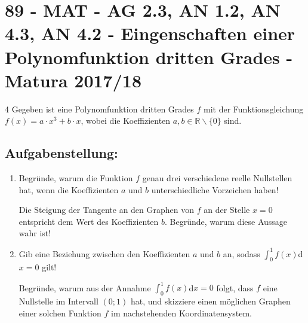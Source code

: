\section{89 - MAT - AG 2.3, AN 1.2, AN 4.3, AN 4.2 - Eingenschaften einer Polynomfunktion dritten Grades - Matura 2017/18}

\begin{langesbeispiel} \item[4] %
			Gegeben ist eine Polynomfunktion dritten Grades $f$ mit der Funktionsgleichung $f(x)=a\cdot x^3+b\cdot x$, wobei die Koeffizienten $a,b\in\mathbb{R}\backslash\{0\}$ sind.

\subsection{Aufgabenstellung:}
\begin{enumerate}
	\item Begründe, warum die Funktion $f$ genau drei verschiedene reelle Nullstellen hat, wenn die Koeffizienten $a$ und $b$ unterschiedliche Vorzeichen haben!
	
	 Die Steigung der Tangente an den Graphen von $f$ an der Stelle $x=0$ entspricht dem Wert des Koeffizienten $b$. Begründe, warum diese Aussage wahr ist!
	
	\item Gib eine Beziehung zwischen den Koeffizienten $a$ und $b$ an, sodass $\displaystyle\int^1_0f(x)$d$x=0$ gilt!
	
	Begründe, warum aus der Annahme $\displaystyle\int^1_0f(x)$d$x=0$ folgt, dass $f$ eine Nullstelle im Intervall $(0;1)$ hat, und skizziere einen möglichen Graphen einer solchen Funktion $f$ im nachstehenden Koordinatensystem.\leer
	

\end{enumerate}
\end{langesbeispiel}
